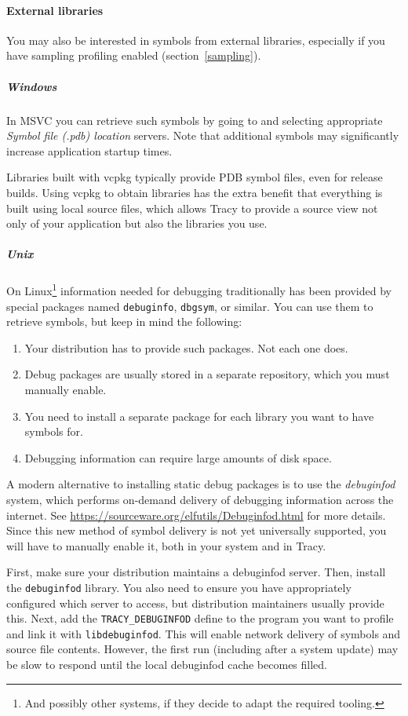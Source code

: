 \documentclass[hidelinks,titlepage,a4paper]{article}
\begin{document}
\paragraph{External libraries}

You may also be interested in symbols from external libraries, especially if you have sampling profiling enabled (section~\ref{sampling}).

\subparagraph{Windows}

In MSVC you can retrieve such symbols by going to  and selecting appropriate \emph{Symbol file (.pdb) location} servers. Note that additional symbols may significantly increase application startup times.

Libraries built with vcpkg typically provide PDB symbol files, even for release builds. Using vcpkg to obtain libraries has the extra benefit that everything is built using local source files, which allows Tracy to provide a source view not only of your application but also the libraries you use.

\subparagraph{Unix}

On Linux\footnote{And possibly other systems, if they decide to adapt the required tooling.} information needed for debugging traditionally has been provided by special packages named \texttt{debuginfo}, \texttt{dbgsym}, or similar. You can use them to retrieve symbols, but keep in mind the following:

\begin{enumerate}
\item Your distribution has to provide such packages. Not each one does.
\item Debug packages are usually stored in a separate repository, which you must manually enable.
\item You need to install a separate package for each library you want to have symbols for.
\item Debugging information can require large amounts of disk space.
\end{enumerate}

A modern alternative to installing static debug packages is to use the \emph{debuginfod} system, which performs on-demand delivery of debugging information across the internet. See \url{https://sourceware.org/elfutils/Debuginfod.html} for more details. Since this new method of symbol delivery is not yet universally supported, you will have to manually enable it, both in your system and in Tracy.

First, make sure your distribution maintains a debuginfod server. Then, install the \texttt{debuginfod} library. You also need to ensure you have appropriately configured which server to access, but distribution maintainers usually provide this. Next, add the \texttt{TRACY\_DEBUGINFOD} define to the program you want to profile and link it with \texttt{libdebuginfod}. This will enable network delivery of symbols and source file contents. However, the first run (including after a system update) may be slow to respond until the local debuginfod cache becomes filled.
\end{document}
